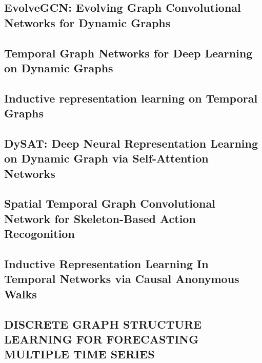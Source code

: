 \subsection{EvolveGCN: Evolving Graph Convolutional Networks for Dynamic Graphs}


\subsection{Temporal Graph Networks for Deep Learning on Dynamic Graphs}


\subsection{Inductive representation learning on Temporal Graphs}


\subsection{DySAT: Deep Neural Representation Learning on Dynamic Graph via Self-Attention Networks}


\subsection{Spatial Temporal Graph Convolutional Network for Skeleton-Based Action Recogonition}


\subsection{Inductive Representation Learning In  Temporal Networks via Causal Anonymous Walks}


\subsection{DISCRETE GRAPH STRUCTURE LEARNING FOR FORECASTING MULTIPLE TIME SERIES}
